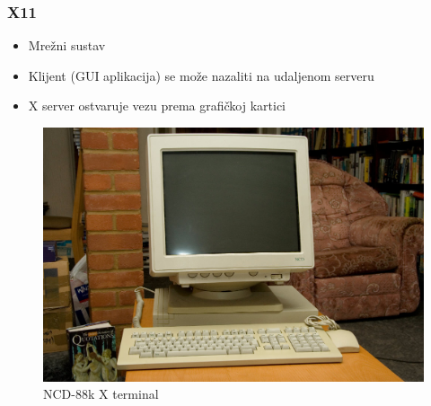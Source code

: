 \documentclass[t,table,usenames,dvipsnames]{beamer}
\begin{document}
\begin{frame}
\begin{figure}[h]
\begin{minipage}{0.25\textwidth}
		\end{minipage}
	\end{figure}
\end{frame}


\begin{frame}
	\frametitle{X11}
	\begin{itemize}
		\item Mrežni sustav
		\item Klijent (GUI aplikacija) se može nazaliti na udaljenom serveru
		\item X server ostvaruje vezu prema grafičkoj kartici
	\end{itemize}
	\begin{figure}
		\begin{minipage}{0.4\textwidth}
			\raggedleft
			\includegraphics[width=\linewidth]{Xterminal.jpg}
			\caption*{NCD-88k X terminal}
		\end{minipage}
		\begin{minipage}{0.25\textwidth}
			\raggedright

\end{minipage}
\end{figure}
\end{frame}
\end{document}
